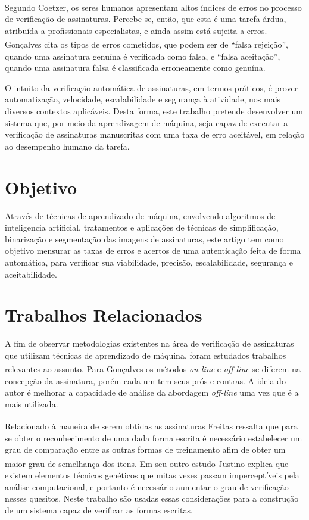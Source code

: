 \documentclass[12pt]{article}
\begin{document}
		Segundo Coetzer\textsuperscript{\cite{coetzer2006}}, os seres humanos apresentam altos índices de erros no processo de verificação de 		assinaturas. Percebe-se, então, que esta é uma tarefa árdua, atribuída a profissionais especialistas, e ainda assim está sujeita a erros. Gonçalves\textsuperscript{\cite{goncalves2008}} cita os tipos de erros cometidos, que podem ser de ``falsa rejeição'', quando uma assinatura genuína é verificada como falsa, e ``falsa aceitação'', quando uma assinatura falsa é classificada erroneamente como genuína.
		
		O intuito da verificação automática de assinaturas, em termos práticos, é prover automatização, velocidade, escalabilidade e segurança à atividade, nos mais diversos contextos aplicáveis. Desta forma, este trabalho pretende desenvolver um sistema que, por meio da aprendizagem de máquina, seja capaz de executar a verificação de assinaturas manuscritas com uma taxa de erro aceitável, em relação ao desempenho humano da tarefa.
	
	\section{Objetivo}
		Através de técnicas de aprendizado de máquina, envolvendo algoritmos de inteligencia artificial, tratamentos e aplicações de técnicas de simplificação, binarização e segmentação das imagens de assinaturas, este artigo tem como objetivo mensurar as taxas de erros e acertos de uma autenticação feita de forma automática, para verificar sua viabilidade, precisão, escalabilidade, segurança e aceitabilidade.
	
	\section{Trabalhos Relacionados}
		A fim de observar metodologias existentes na área de verificação de assinaturas que utilizam técnicas de aprendizado de máquina, foram estudados trabalhos relevantes ao assunto. Para Gonçalves\textsuperscript{\cite{goncalves2008}} os métodos \textit{on-line} e \textit{off-line} se diferem na concepção da assinatura, porém cada um tem seus prós e contras. A ideia do autor é melhorar a capacidade de análise da abordagem \textit{off-line} uma vez que é a mais utilizada.
		
		Relacionado à maneira de serem obtidas as assinaturas Freitas\textsuperscript{\cite{freitas2003}} ressalta que para se obter o reconhecimento de uma dada forma escrita é necessário estabelecer um grau de comparação entre as outras formas de treinamento afim de obter um maior grau de semelhança dos itens. Em seu outro estudo Justino\textsuperscript{\cite{justino2001}} explica que existem elementos técnicos genéticos que mitas vezes passam imperceptíveis pela análise computacional, e portanto é necessário aumentar o grau de verificação nesses quesitos. Neste trabalho são usadas essas considerações para a construção de um sistema capaz de verificar as formas escritas. 
		
\end{document}
